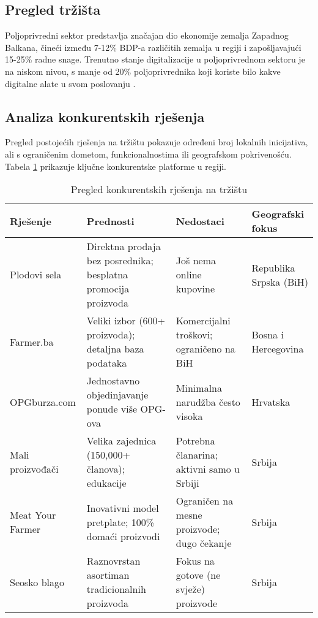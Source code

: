 \documentclass[a4paper,12pt]{article}
\begin{document}
\subsection{Pregled tržišta}

Poljoprivredni sektor predstavlja značajan dio ekonomije zemalja Zapadnog Balkana, čineći između 7-12\% BDP-a različitih zemalja u regiji i zapošljavajući 15-25\% radne snage. Trenutno stanje digitalizacije u poljoprivrednom sektoru je na niskom nivou, s manje od 20\% poljoprivrednika koji koriste bilo kakve digitalne alate u svom poslovanju \cite{WorldBank2022}.

\subsection{Analiza konkurentskih rješenja}

Pregled postojećih rješenja na tržištu pokazuje određeni broj lokalnih inicijativa, ali s ograničenim dometom, funkcionalnostima ili geografskom pokrivenošću. Tabela \ref{table:konkurencija} prikazuje ključne konkurentske platforme u regiji.

\begin{table}[H]
\centering
\caption{Pregled konkurentskih rješenja na tržištu}
\label{table:konkurencija}
\begin{tabularx}{\textwidth}{|l|X|l|X|}
\hline
\textbf{Rješenje} & \textbf{Prednosti} & \textbf{Nedostaci} & \textbf{Geografski fokus} \\
\hline
Plodovi sela & Direktna prodaja bez posrednika; besplatna promocija proizvoda & Još nema online kupovine & Republika Srpska (BiH) \\
\hline
Farmer.ba & Veliki izbor (600+ proizvoda); detaljna baza podataka & Komercijalni troškovi; ograničeno na BiH & Bosna i Hercegovina \\
\hline
OPGburza.com & Jednostavno objedinjavanje ponude više OPG-ova & Minimalna narudžba često visoka & Hrvatska \\
\hline
Mali proizvođači & Velika zajednica (150,000+ članova); edukacije & Potrebna članarina; aktivni samo u Srbiji & Srbija \\
\hline
Meat Your Farmer & Inovativni model pretplate; 100\% domaći proizvodi & Ograničen na mesne proizvode; dugo čekanje & Srbija \\
\hline
Seosko blago & Raznovrstan asortiman tradicionalnih proizvoda & Fokus na gotove (ne svježe) proizvode & Srbija \\
\hline
\end{tabularx}
\end{table}
\end{document}
